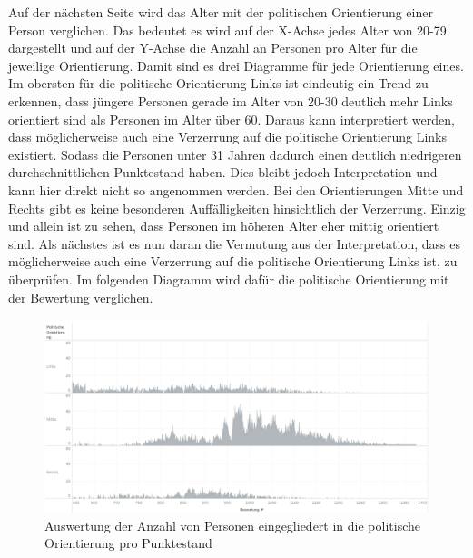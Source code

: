 \begin{onehalfspace}
Auf der nächsten Seite wird das Alter mit der politischen Orientierung einer Person verglichen. Das bedeutet es wird auf der X-Achse jedes Alter von 20-79 dargestellt und auf der Y-Achse die Anzahl an Personen pro Alter für die jeweilige Orientierung. Damit sind es drei Diagramme für jede Orientierung eines. Im obersten für die politische Orientierung Links ist eindeutig ein Trend zu erkennen, dass jüngere Personen gerade im Alter von 20-30 deutlich mehr Links orientiert sind als Personen im Alter über 60. Daraus kann interpretiert werden, dass möglicherweise auch eine Verzerrung auf die politische Orientierung Links existiert. Sodass die Personen unter 31 Jahren dadurch einen deutlich niedrigeren durchschnittlichen Punktestand haben. Dies bleibt jedoch Interpretation und kann hier direkt nicht so angenommen werden. Bei den Orientierungen Mitte und Rechts gibt es keine besonderen Auffälligkeiten hinsichtlich der Verzerrung. Einzig und allein ist zu sehen, dass Personen im höheren Alter eher mittig orientiert sind. Als nächstes ist es nun daran die Vermutung aus der Interpretation, dass es möglicherweise auch eine Verzerrung auf die politische Orientierung Links ist, zu überprüfen. Im folgenden Diagramm wird dafür die politische Orientierung mit der Bewertung verglichen.\\
\begin{figure}[h]
    \centering
    \includegraphics[width=16cm]{Diagramme/Tab_Point3.PNG}
    \caption{Auswertung der Anzahl von Personen eingegliedert in die politische Orientierung pro Punktestand}
    \label{fig:TabPoint3}
\end{figure}\\

\end{onehalfspace}
